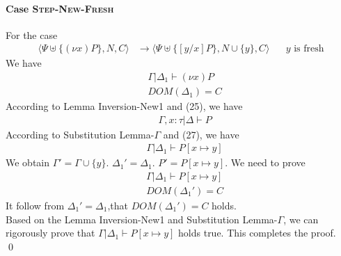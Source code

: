 \documentclass[master,english]{kuisthesis}
\theoremstyle{definition}
\begin{document}
\paragraph{Case \textsc{Step-New-Fresh}} For the case
\begin{align*}
  \langle\Psi \uplus\{(\nu x) P\}, N, C\rangle &\longrightarrow\langle\Psi \uplus\{[y / x] P\}, N \cup \{y\}, C\rangle \quad \text{ $y$ is fresh} 
\end{align*}\noindent
We have
\begin{align}
    &\Gamma | \Delta_1 \vdash (\nu x)P
    \\&DOM(\Delta_1) = C 
\end{align}\noindent
According to Lemma Inversion-New1 and (25), we have
\begin{align}
    &\Gamma, x : \tau |\Delta \vdash P  
\end{align}\noindent
According to Substitution Lemma-$\Gamma$ and (27), we have
\begin{align}
    &\Gamma | \Delta_1 \vdash P[x \mapsto y]  
\end{align}\noindent
We obtain $\Gamma' = \Gamma \cup \{y\} $. $\Delta_1' = \Delta_1 $. $P' = P[x \mapsto y]$. We need to prove
\begin{align*}
    &\Gamma | \Delta_1 \vdash P[x \mapsto y]
    \\&DOM(\Delta_1') = C 
\end{align*}\noindent
It follow from $\Delta_1' = \Delta_1 $,that  $DOM(\Delta_1' ) = C $ holds.
\\Based on the Lemma Inversion-New1 and Substitution Lemma-$\Gamma$, we can rigorously prove that $\Gamma | \Delta_1 \vdash P[x \mapsto y] $ holds true. This completes the proof.\\

\qed
\end{document}
